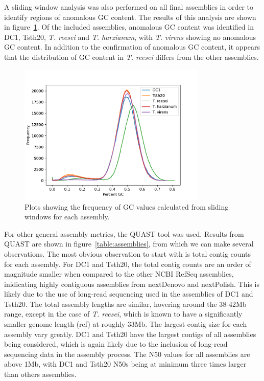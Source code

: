 A sliding window analysis was also performed on all final assemblies
in order to identify regions of anomalous GC content. The results of
this analysis are shown in figure~\ref{fig:assembly-gc}. Of the
included assemblies, anomalous GC content was identified in DC1,
Tsth20, \textit{T. reesei} and \textit{T. harzianum}, with
\textit{T. virens} showing no anomalous GC content. In addition to the
confirmation of anomalous GC content, it appears that the distribution
of GC content in \textit{T. reesei} differs from the other assemblies.

\begin{figure}
  \begin{center}
    \includegraphics[width=0.8\textwidth]{figures/gc-plot.pdf}
  \end{center}
  \caption{Plots showing the frequency of GC values calculated from
    sliding windows for each assembly.}
  \label{fig:assembly-gc}
\end{figure}

For other general assembly metrics, the QUAST tool was used. Results
from QUAST are shown in figure~\ref{table:assemblies}, from which we can
make several observations. The most obvious observation to start with
is total contig counts for each assembly. For DC1 and Tsth20, the
total contig counts are an order of magnitude smaller when compared to
the other NCBI RefSeq assemblies, inidicating highly contiguous
assemblies from nextDenovo and nextPolish. This is likely due to the
use of long-read sequencing used in the assemblies of DC1 and
Tsth20. The total assembly lengths are similar, hovering around the
38-42Mb range, except in the case of \textit{T. reesei}, which is
known to have a significantly smaller genome length (ref) at roughly
33Mb. The largest contig size for each assembly vary greatly. DC1 and
Tsth20 have the largest contigs of all assemblies being considered,
which is again likely due to the inclusion of long-read sequencing
data in the assembly process. The N50 values for all assemblies are
above 1Mb, with DC1 and Tsth20 N50s being at minimum three times
larger than others assemblies.


